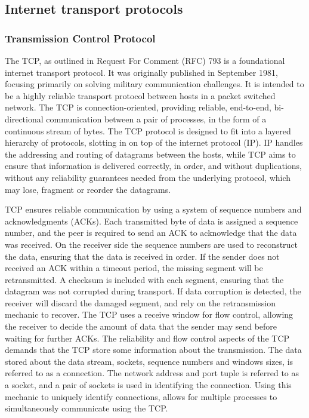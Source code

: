 \documentclass[english, 12pt, a4paper, elec, utf8, a-2b, online]{aaltothesis}
\begin{document}
\subsection{Internet transport protocols}
\subsubsection{Transmission Control Protocol}
The TCP, as outlined in Request For Comment (RFC)
793 is a foundational internet transport protocol. It was
originally published in September 1981, focusing primarily on solving military
communication challenges. It is intended to be a highly reliable transport
protocol between hosts in a packet switched network. The TCP is connection-oriented,
providing reliable, end-to-end, bi-directional communication between a pair of processes, in the
form of a continuous stream of bytes. The TCP protocol is designed to fit into
a layered hierarchy of protocols, slotting
in on top of the internet protocol (IP)\cite{rfc791}. IP handles the addressing
and routing of datagrams between the hosts, while TCP aims to ensure that
information is delivered correctly, in order, and without duplications, without
any reliability guarantees needed from the underlying protocol, which may lose,
fragment or reorder the datagrams\cite{rfc793}.

TCP ensures reliable communication by using a system of sequence numbers and
acknowledgments (ACKs). Each transmitted byte of data is assigned a sequence
number, and the peer is required to send an ACK to acknowledge that the data was
received. On the receiver side the sequence numbers are used to reconstruct the
data, ensuring that the data is received in order. If the sender does not received
an ACK within a timeout period, the missing segment will be retransmitted. A
checksum is included with each segment, ensuring that the datagram was not
corrupted during transport. If data corruption is detected, the receiver will
discard the damaged segment, and rely on the retransmission mechanic to recover.
The TCP uses a receive window for flow control, allowing the receiver to decide 
the amount of data that the sender may send before waiting for further ACKs. The
reliability and flow control aspects of the TCP demands that the TCP store some
information about the transmission. The data stored about the data stream, sockets,
sequence numbers and windows sizes, is referred to as a connection. The network
address and port tuple is referred to as a socket, and a pair of sockets is used
in identifying the connection. Using this mechanic to uniquely identify connections,
allows for multiple processes to simultaneously communicate using the TCP\cite{rfc793}.
\end{document}

